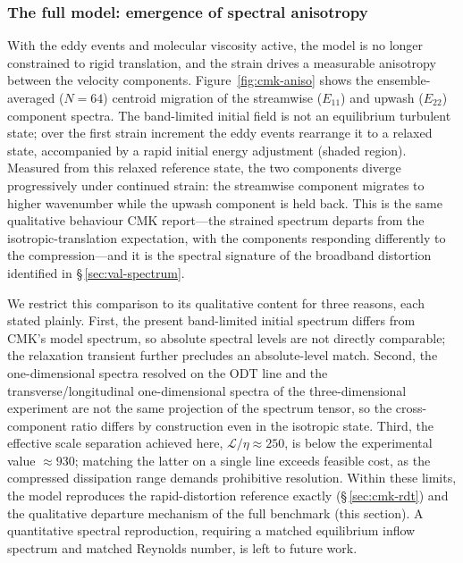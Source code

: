\documentclass[lineno]{JFM-FLM_Au}
\begin{document}
\subsubsection{The full model: emergence of spectral
anisotropy}\label{sec:cmk-full}

With the eddy events and molecular viscosity active, the model is no longer
constrained to rigid translation, and the strain drives a measurable anisotropy
between the velocity components. Figure~\ref{fig:cmk-aniso} shows the
ensemble-averaged ($N=64$) centroid migration of the streamwise ($E_{11}$) and
upwash ($E_{22}$) component spectra. The band-limited initial field is not an
equilibrium turbulent state; over the first strain increment the eddy events
rearrange it to a relaxed state, accompanied by a rapid initial energy
adjustment (shaded region). Measured from this relaxed reference state, the two
components diverge progressively under continued strain: the streamwise
component migrates to higher wavenumber while the upwash component is held back.
This is the same qualitative behaviour CMK report---the strained spectrum
departs from the isotropic-translation expectation, with the components
responding differently to the compression---and it is the spectral signature of
the broadband distortion identified in \S\,\ref{sec:val-spectrum}.

We restrict this comparison to its qualitative content for three reasons, each
stated plainly. First, the present band-limited initial spectrum differs from
CMK's model spectrum, so absolute spectral levels are not directly comparable;
the relaxation transient further precludes an absolute-level match. Second, the
one-dimensional spectra resolved on the ODT line and the transverse/longitudinal
one-dimensional spectra of the three-dimensional experiment are not the same
projection of the spectrum tensor, so the cross-component ratio differs by
construction even in the isotropic state. Third, the effective scale separation
achieved here, $\mathcal{L}/\eta\approx250$, is below the experimental value
$\approx930$; matching the latter on a single line exceeds feasible cost, as the
compressed dissipation range demands prohibitive resolution. Within these
limits, the model reproduces the rapid-distortion reference exactly
(\S\,\ref{sec:cmk-rdt}) and the qualitative departure mechanism of the full
benchmark (this section). A quantitative spectral reproduction, requiring a
matched equilibrium inflow spectrum and matched Reynolds number, is left to
future work.
\end{document}
